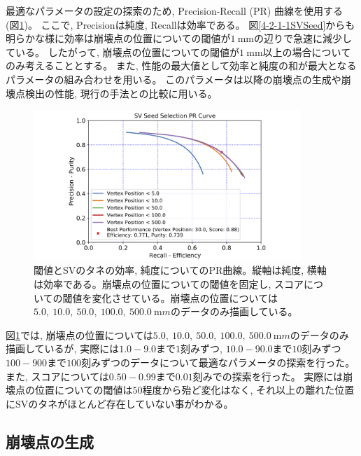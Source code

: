 最適なパラメータの設定の探索のため, Precision-Recall (PR) 曲線を使用する (図\ref{4-2-1-2PRCurve})。
ここで, Precisionは純度, Recallは効率である。
図\ref{4-2-1-1SVSeed}からも明らかな様に効率は崩壊点の位置についての閾値が$1\ \mathrm{mm}$の辺りで急速に減少している。
したがって, 崩壊点の位置についての閾値が$1\ \mathrm{mm}$以上の場合についてのみ考えることとする。
また, 性能の最大値として効率と純度の和が最大となるパラメータの組み合わせを用いる。
このパラメータは以降の崩壊点の生成や崩壊点検出の性能, 現行の手法との比較に用いる。

\begin{figure}[htbp]
 \centering
 \includegraphics[width=0.9\textwidth, clip]{Figure/4VertexFinderwithDL/4-2-1-2PRCurve.png}
 \caption[閾値とSVのタネの効率, 純度についてのPR曲線]{閾値とSVのタネの効率, 純度についてのPR曲線。縦軸は純度, 横軸は効率である。崩壊点の位置についての閾値を固定し, スコアについての閾値を変化させている。崩壊点の位置については$5.0,\ 10.0,\ 50.0,\ 100.0,\ 500.0\ {\mathrm mm}$のデータのみ描画している。}
 \label{4-2-1-2PRCurve}
\end{figure}

図\ref{4-2-1-2PRCurve}では, 崩壊点の位置については$5.0,\ 10.0,\ 50.0,\ 100.0,\ 500.0\ {\mathrm mm}$のデータのみ描画しているが, 実際には$1.0-9.0$まで$1$刻みずつ, $10.0-90.0$まで$10$刻みずつ$100-900$まで$100$刻みずつのデータについて最適なパラメータの探索を行った。
また, スコアについては$0.50-0.99$まで$0.01$刻みでの探索を行った。
実際には崩壊点の位置についての閾値は$50$程度から殆ど変化はなく, それ以上の離れた位置にSVのタネがほとんど存在していない事がわかる。

\subsection{崩壊点の生成} \label{VFDL:TPVFDL:VertexProduction}


